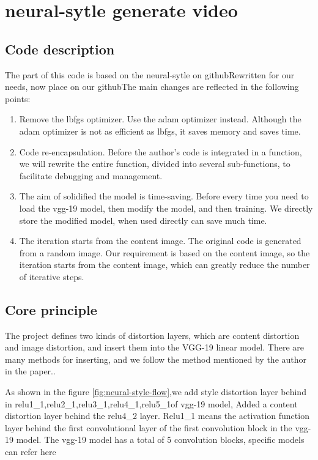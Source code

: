 \section{neural-sytle generate video}
\subsection{Code description}
The part of this code is based on the neural-sytle on github\cite{neural-style}Rewritten for our needs, now place on our github\cite{neural-style-diy}The main changes are reflected in the following points:
\begin{enumerate}
  \item Remove the lbfgs optimizer. Use the adam optimizer instead. Although the adam optimizer is not as efficient as lbfgs, it saves memory and saves time.
  \item Code re-encapsulation. Before the author's code is integrated in a function, we will rewrite the entire function, divided into several sub-functions, to facilitate debugging and management.
  \item The aim of solidified the model is time-saving. Before every time you need to load the vgg-19 model, then modify the model, and then training. We directly store the modified model, when used directly can save much time.
  \item The iteration starts from the content image. The original code is generated from a random image. Our requirement is based on the content image, so the iteration starts from the content image, which can greatly reduce the number of iterative steps.
\end{enumerate}
\subsection{Core principle}
The project defines two kinds of distortion layers, which are content distortion and image distortion, and insert them into the VGG-19 linear model. There are many methods for inserting, and we follow the method mentioned by the author in the paper.\cite{article:neural-style}.

As shown in the figure \ref{fig:neural-style-flow},we add style distortion layer behind in relu1\_1,relu2\_1,relu3\_1,relu4\_1,relu5\_1of vgg-19 model, Added a content distortion layer behind the relu4\_2 layer. Relu1\_1 means the activation function layer behind the first convolutional layer of the first convolution block in the vgg-19 model. The vgg-19 model has a total of 5 convolution blocks, specific models can refer here\cite{vgg-19}

